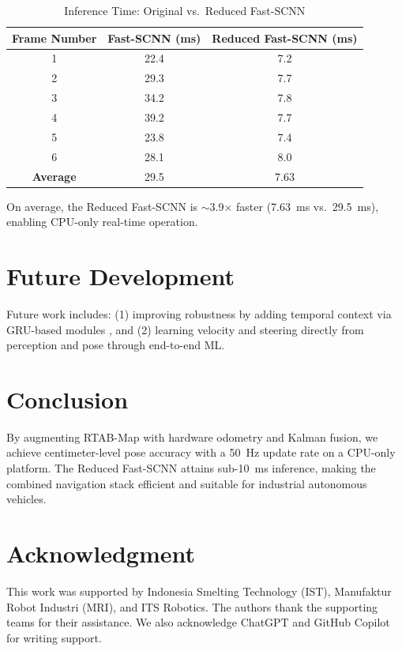 \documentclass[conference, a4paper]{IEEEtran}[2015/08/26]
\begin{document}
\begin{table}[H]
	\centering
	\caption{Inference Time: Original vs.\ Reduced Fast-SCNN}
	\label{tab:lane_detection_inference_time}
	\begin{tabular}{|c|c|c|}
		\hline
		\textbf{Frame Number} & \textbf{Fast-SCNN (ms)} & \textbf{Reduced Fast-SCNN (ms)} \\ \hline
		1 & 22.4 & 7.2 \\ \hline
		2 & 29.3 & 7.7 \\ \hline
		3 & 34.2 & 7.8 \\ \hline
		4 & 39.2 & 7.7 \\ \hline
		5 & 23.8 & 7.4 \\ \hline
		6 & 28.1 & 8.0 \\ \hline
		\textbf{Average} & 29.5 & 7.63 \\ \hline
	\end{tabular}
\end{table}

On average, the Reduced Fast-SCNN is $\sim$3.9$\times$ faster (7.63~ms vs.\ 29.5~ms), enabling CPU-only real-time operation.

\section{Future Development}
Future work includes: (1) improving robustness by adding temporal context via GRU-based modules \cite{ref_gru}, and (2) learning velocity and steering directly from perception and pose through end-to-end ML.

\section{Conclusion}
By augmenting RTAB-Map with hardware odometry and Kalman fusion, we achieve centimeter-level pose accuracy with a 50~Hz update rate on a CPU-only platform. The Reduced Fast-SCNN attains sub-10~ms inference, making the combined navigation stack efficient and suitable for industrial autonomous vehicles.

\section{Acknowledgment}
This work was supported by Indonesia Smelting Technology (IST), Manufaktur Robot Industri (MRI), and ITS Robotics. The authors thank the supporting teams for their assistance. We also acknowledge ChatGPT and GitHub Copilot for writing support.




\end{document}
